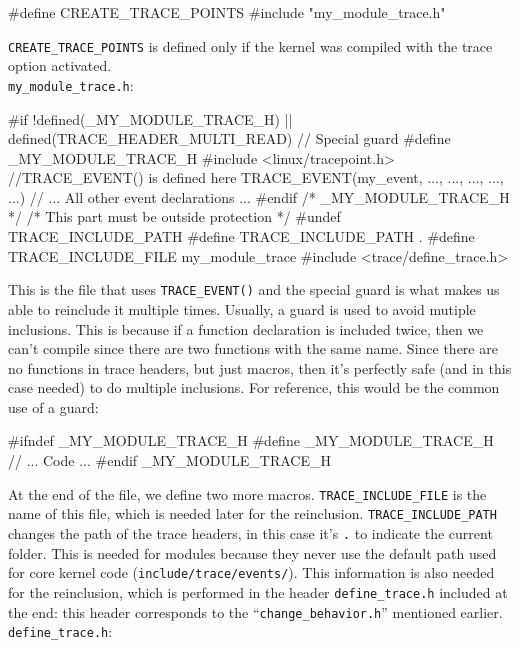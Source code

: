 \begin{code}
#define CREATE_TRACE_POINTS
#include "my_module_trace.h"
\end{code}
\verb|CREATE_TRACE_POINTS| is defined only if the kernel was compiled with the trace option activated.\\\verb|my_module_trace.h|:
\begin{code}
#if !defined(_MY_MODULE_TRACE_H) || defined(TRACE_HEADER_MULTI_READ) // Special guard
#define _MY_MODULE_TRACE_H
#include <linux/tracepoint.h> //TRACE_EVENT() is defined here
TRACE_EVENT(my_event, ..., ..., ..., ..., ...)
// ... All other event declarations ...
#endif /* _MY_MODULE_TRACE_H */
/* This part must be outside protection */
#undef TRACE_INCLUDE_PATH
#define TRACE_INCLUDE_PATH .
#define TRACE_INCLUDE_FILE my_module_trace
#include <trace/define_trace.h>
\end{code}
This is the file that uses \verb|TRACE_EVENT()| and the special guard is what makes us able to reinclude it multiple times. Usually, a guard is used to avoid mutiple inclusions. This is because if a function declaration is included twice, then we can't compile since there are two functions with the same name. Since there are no functions in trace headers, but just macros, then it's perfectly safe (and in this case needed) to do multiple inclusions. For reference, this would be the common use of a guard:
\begin{code}
#ifndef _MY_MODULE_TRACE_H
#define _MY_MODULE_TRACE_H
// ... Code ...
#endif _MY_MODULE_TRACE_H
\end{code}
At the end of the file, we define two more macros. \verb|TRACE_INCLUDE_FILE| is the name of this file, which is needed later for the reinclusion. \verb|TRACE_INCLUDE_PATH| changes the path of the trace headers, in this case it's \verb|.| to indicate the current folder. This is needed for modules because they never use the default path used for core kernel code (\verb|include/trace/events/|). This information is also needed for the reinclusion, which is performed in the header \verb|define_trace.h| included at the end: this header corresponds to the ``\verb|change_behavior.h|'' mentioned earlier.\\\verb|define_trace.h|:
